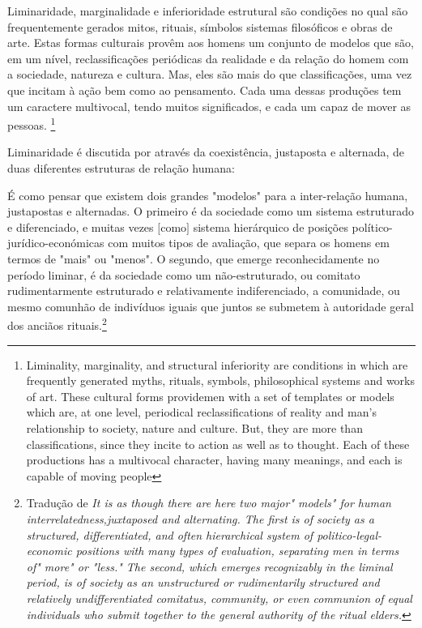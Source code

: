 \begin{citacao}
Liminaridade, marginalidade e inferioridade estrutural são condições no qual são frequentemente gerados mitos, rituais, símbolos sistemas filosóficos e obras de arte. Estas formas culturais provêm aos homens um conjunto de  modelos que são, em um nível, reclassificações periódicas da realidade e da relação do homem com a sociedade, natureza e cultura. Mas, eles são mais do que classificações, uma vez que incitam à ação bem como ao pensamento. Cada uma dessas produções tem um caractere multivocal, tendo muitos significados, e cada um capaz de mover as pessoas. \footnote{Liminality, marginality, and structural inferiority are conditions in which are frequently generated myths, rituals, symbols, philosophical systems and works of art. These cultural forms providemen with a set of templates or models which are, at one level, periodical reclassifications of reality and man's relationship to society, nature and culture. But, they are more than classifications, since they incite to action as well as to thought. Each of these productions has a multivocal character, having many meanings, and each is capable of moving people}
\end{citacao}

Liminaridade é discutida por  através da coexistência, justaposta e alternada, de duas diferentes estruturas de relação humana:

\begin{citacao}
É como pensar que existem dois grandes "modelos" para a inter-relação humana, justapostas e alternadas. O primeiro é da sociedade como um sistema estruturado e diferenciado, e muitas vezes $[$como$]$ sistema hierárquico de posições político-jurídico-económicas com muitos tipos de avaliação, que separa os homens em termos de "mais" ou "menos". O segundo, que emerge reconhecidamente no período liminar, é da sociedade como um não-estruturado, ou comitato rudimentarmente estruturado e relativamente indiferenciado, a comunidade, ou mesmo comunhão de indivíduos iguais que juntos se submetem à autoridade geral dos anciãos rituais.\footnote{Tradução de \emph{It is as though there are here two major" models" for human interrelatedness,juxtaposed and alternating. The first is of society as a structured, differentiated, and often hierarchical system of politico-legal-economic positions with many types of evaluation, separating men in terms of" more" or "less." The second, which emerges recognizably in the liminal period, is of society as an unstructured or rudimentarily structured and relatively undifferentiated comitatus, community, or even communion of equal individuals who submit together to the general authority of the ritual elders.}}
\end{citacao}

